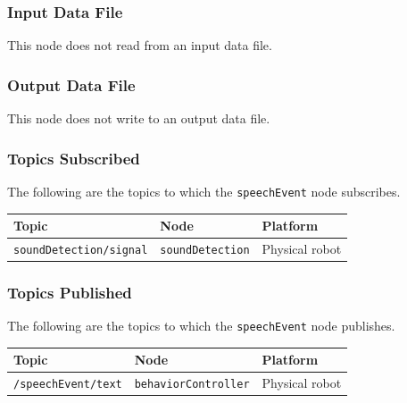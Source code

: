 \documentclass{CSSRforAfrica}
\begin{document}
{\subsubsection*{Input Data File}
This node does not read from an input data file.


\subsubsection*{Output Data File}
This node does not write to an output data file.


\subsubsection*{Topics Subscribed}

The following are the topics to which the {\small \verb+speechEvent+} node subscribes.

\begin{center}
\begin{tabularx}{\linewidth}{| l | l | X|}
\hline 
{\small Topic }                               & {\small Node }                            &  {\small Platform}       \\
\hline
{\footnotesize \verb+soundDetection/signal+ }  & {\footnotesize \verb+soundDetection+}    & {\small Physical robot } \\ 
\hline
\end{tabularx}
\end{center}


\subsubsection*{Topics Published}

The following are the topics to which the {\small \verb+speechEvent+} node publishes.
 
\begin{center}
\begin{tabularx}{\linewidth}{| l | l | X|}
\hline 
{\small Topic }                                                                                & {\small  Node}    &  {\small Platform}       \\
\hline
{\footnotesize \verb+/speechEvent/text+ }  & {\footnotesize \verb+behaviorController+} & {\small Physical robot} \\ 
\hline
\end{tabularx}
\end{center}

}
\end{document}
